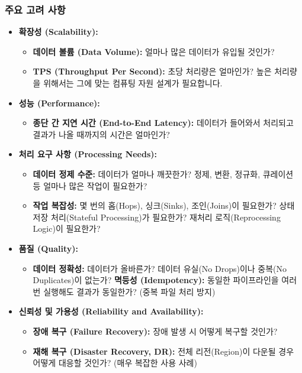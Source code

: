 \documentclass[11pt,a4paper]{article}
\theoremstyle{definition}
\begin{document}
\subsubsection{주요 고려 사항}
\begin{itemize}
    \item \textbf{확장성 (Scalability):}
    \begin{itemize}
        \item \textbf{데이터 볼륨 (Data Volume):} 얼마나 많은 데이터가 유입될 것인가?
        \item \textbf{TPS (Throughput Per Second):} 초당 처리량은 얼마인가? 높은 처리량을 위해서는 그에 맞는 컴퓨팅 자원 설계가 필요합니다.
    \end{itemize}
    \item \textbf{성능 (Performance):}
    \begin{itemize}
        \item \textbf{종단 간 지연 시간 (End-to-End Latency):} 데이터가 들어와서 처리되고 결과가 나올 때까지의 시간은 얼마인가?
    \end{itemize}
    \item \textbf{처리 요구 사항 (Processing Needs):}
    \begin{itemize}
        \item \textbf{데이터 정제 수준:} 데이터가 얼마나 깨끗한가? 정제, 변환, 정규화, 큐레이션 등 얼마나 많은 작업이 필요한가?
        \item \textbf{작업 복잡성:} 몇 번의 홉(Hops), 싱크(Sinks), 조인(Joins)이 필요한가? 상태 저장 처리(Stateful Processing)가 필요한가? 재처리 로직(Reprocessing Logic)이 필요한가?
    \end{itemize}
    \item \textbf{품질 (Quality):}
    \begin{itemize}
        \item \textbf{데이터 정확성:} 데이터가 올바른가? 데이터 유실(No Drops)이나 중복(No Duplicates)이 없는가?
        \textbf{멱등성 (Idempotency):} 동일한 파이프라인을 여러 번 실행해도 결과가 동일한가? (중복 파일 처리 방지)
    \end{itemize}
    \item \textbf{신뢰성 및 가용성 (Reliability and Availability):}
    \begin{itemize}
        \item \textbf{장애 복구 (Failure Recovery):} 장애 발생 시 어떻게 복구할 것인가?
        \item \textbf{재해 복구 (Disaster Recovery, DR):} 전체 리전(Region)이 다운될 경우 어떻게 대응할 것인가? (매우 복잡한 사용 사례)
    \end{itemize}
\end{itemize}
\end{document}
